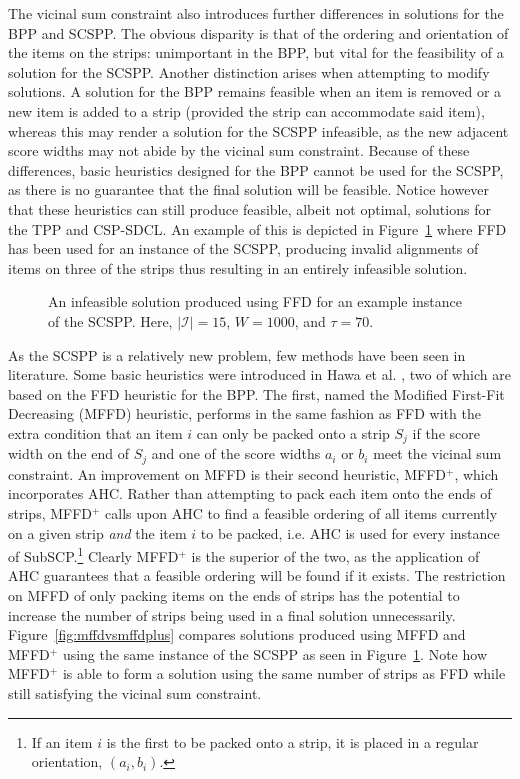 \documentclass{elsarticle}
\begin{document}
The vicinal sum constraint also introduces further differences in solutions for the BPP and SCSPP. The obvious disparity is that of the ordering and orientation of the items on the strips: unimportant in the BPP, but vital for the feasibility of a solution for the SCSPP. Another distinction arises when attempting to modify solutions. A solution for the BPP remains feasible when an item is removed or a new item is added to a strip (provided the strip can accommodate said item), whereas this may render a solution for the SCSPP infeasible, as the new adjacent score widths may not abide by the vicinal sum constraint. Because of these differences, basic heuristics designed for the BPP cannot be used for the SCSPP, as there is no guarantee that the final solution will be feasible. Notice however that these heuristics can still produce feasible, albeit not optimal, solutions for the TPP and CSP-SDCL. An example of this is depicted in Figure~\ref{fig:ffd} where FFD has been used for an instance of the SCSPP, producing invalid alignments of items on three of the strips thus resulting in an entirely infeasible solution.

\begin{figure}[H]	
	\centering
	
	\caption{An infeasible solution produced using FFD for an example instance of the SCSPP. Here, $|\mathcal{I}| = 15$, $W = 1000$, and $\tau = 70$. }	
	\label{fig:ffd}
\end{figure}

\noindent As the SCSPP is a relatively new problem, few methods have been seen in literature. Some basic heuristics were introduced in Hawa et al. \cite{hawa2018}, two of which are based on the FFD heuristic for the BPP. The first, named the Modified First-Fit Decreasing (MFFD) heuristic, performs in the same fashion as FFD with the extra condition that an item $i$ can only be packed onto a strip $S_j$ if the score width on the end of $S_j$ and one of the score widths $a_i$ or $b_i$ meet the vicinal sum constraint. An improvement on MFFD is their second heuristic, MFFD$^+$, which incorporates AHC. Rather than attempting to pack each item onto the ends of strips, MFFD$^+$ calls upon AHC to find a feasible ordering of all items currently on a given strip \emph{and} the item $i$ to be packed, i.e. AHC is used for every instance of SubSCP.\footnote{If an item $i$ is the first to be packed onto a strip, it is placed in a regular orientation, $(a_i, b_i)$.} Clearly MFFD$^+$ is the superior of the two, as the application of AHC guarantees that a feasible ordering will be found if it exists. The restriction on MFFD of only packing items on the ends of strips has the potential to increase the number of strips being used in a final solution unnecessarily. Figure~\ref{fig:mffdvsmffdplus} compares solutions produced using MFFD and MFFD$^+$ using the same instance of the SCSPP as seen in Figure~\ref{fig:ffd}. Note how MFFD$^+$ is able to form a solution using the same number of strips as FFD while still satisfying the vicinal sum constraint.
\end{document}
